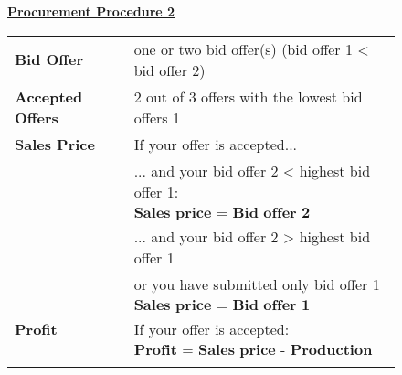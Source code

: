 \documentclass[11pt]{article}
\begin{document}
{\begin{figure}[ht!]
\begin{minipage}[t]{1\linewidth}
\begin{tcolorbox}[arc=0pt,colframe=black!25]
			\textbf{\underline{Procurement Procedure 2}} ~\bigbreak

				\begin{tabular}{ll} \medbreak
					\textbf{Bid Offer} 				& one or two bid offer(s) (bid offer 1 < bid offer 2) \\ \medbreak
					\textbf{Accepted Offers} 		& 2 out of 3 offers with the lowest bid offers 1 \\ \medbreak
					\textbf{Sales Price} 			& If your offer is accepted... \\ 
													& ... and your bid offer 2 < highest bid offer 1: \\ \medbreak
													& \hspace{0.8cm} $\textbf{Sales price = Bid offer 2}$ \\ 
													& ... and your bid offer 2 > highest bid offer 1 \\
													& \hspace{0.4cm} or you have submitted only bid offer 1 \\ \medbreak
													& \hspace{0.8cm} $\textbf{Sales price = Bid offer 1}$ \\ 
					\textbf{Profit}					& If your offer is accepted: \\ 
													& \hspace{0.8cm} $\textbf{Profit = Sales price - Production cost}$ \\
					\hspace{3.75cm}					& 	   
				\end{tabular} 
 
		\end{tcolorbox} 
	\end{minipage}  
  \end{figure}
 \clearpage
 \restoregeometry
}

~\newpage


\end{document}
